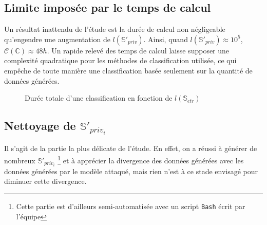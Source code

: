         \subsection{Limite imposée par le temps de calcul}

            Un résultat inattendu de l'étude est la durée de calcul non négligeable qu'engendre
            une augmentation de $l\left(\mathbb{S}'_{priv}\right)$. Ainsi, quand $l\left( \mathbb{S}'_{priv} \right) \approx 10^5$,
            $\mathcal C \left( \mathbb C \right) \approx 48h$. Un rapide relevé des temps de
            calcul laisse supposer une complexité quadratique pour les méthodes de
            classification utilisée, ce qui empêche de toute manière une classification
            basée seulement sur la quantité de données générées.

           \begin{figure}[H]
                \centering{}
                \caption{Durée totale d'une classification en fonction de $l\left(\mathbb S_{etr}\right)$}
            \end{figure}
        \newpage\subsection{Nettoyage de $\mathbb{S}'_{priv_i}$}
            Il s'agit de la partie la plus délicate de l'étude. En effet, on a réussi à
            générer de nombreux $\mathbb{S}'_{priv_i}$
            \footnote{Cette partie est d'ailleurs semi-automatisée avec un script \texttt{Bash} écrit par l'équipe} et à apprécier la divergence
            des données générées avec les données générées par le modèle attaqué, mais rien
            n'est à ce stade envisagé pour diminuer cette divergence.

